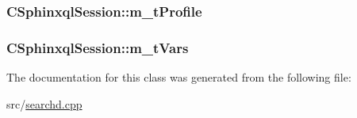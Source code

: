 \hypertarget{classCSphinxqlSession_a58ff8dc45380faae20f96f226f69de7b}{
\subsubsection[{m\-\_\-t\-Profile}]{ C\-Sphinxql\-Session\-::m\-\_\-t\-Profile}}\label{classCSphinxqlSession_a58ff8dc45380faae20f96f226f69de7b}
\hypertarget{classCSphinxqlSession_ad6557bdc798d05ced6a47a4c5d4ebb40}{
\subsubsection[{m\-\_\-t\-Vars}]{ C\-Sphinxql\-Session\-::m\-\_\-t\-Vars}}\label{classCSphinxqlSession_ad6557bdc798d05ced6a47a4c5d4ebb40}


The documentation for this class was generated from the following file\-:\begin{DoxyCompactItemize}
\item 
src/\hyperlink{searchd_8cpp}{searchd.\-cpp}\end{DoxyCompactItemize}
